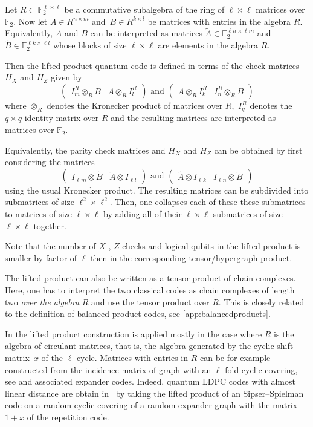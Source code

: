 \documentclass[amsmath, amssymb, floatfix, reprint, twocolumn, notitlepage, 10pt]{revtex4-1}
\newcommand{\change}{}
\begin{document}
Let $R\subset \mathbb{F}_2^{\ell\times \ell}$
be a commutative subalgebra of the ring of $\ell\times\ell$ matrices over $\mathbb{F}_2.$
Now let $A\in R^{n\times m}$ and~$B\in R^{k\times l}$ be matrices with entries in the algebra $R.$ Equivalently, $A$ and $B$ can be interpreted as matrices $\tilde{A}\in \mathbb{F}_2^{\ell n\times \ell m}$ and $\tilde{B}\in \mathbb{F}_2^{\ell k\times \ell l}$ whose blocks of size $\ell\times\ell$ are elements in the algebra $R.$ 

{\change Then the lifted product quantum code is defined in terms of the check matrices $H_X$ and $H_Z$ given by
$$\begin{pmatrix}
 I_m^R\otimes_R B &
 A\otimes_R I_l^R 
\end{pmatrix}\text{ and } 
\begin{pmatrix} A\otimes_R I_k^R & I_n^R\otimes_R B\end{pmatrix}$$
where $\otimes_R$ denotes the Kronecker product of matrices over $R,$ $I_q^R$ denotes the $q\times q$ identity matrix over $R$ and the resulting matrices are interpreted as matrices over $\mathbb{F}_2.$ 

Equivalently, the parity check matrices and $H_X$ and $H_Z$ can be obtained by first considering the matrices
$$\begin{pmatrix}
 I_{\ell m}\otimes \tilde{B} &
 \tilde{A}\otimes I_{\ell l} 
\end{pmatrix}\text{ and } 
\begin{pmatrix} \tilde{A}\otimes I_{\ell k} & I_{\ell n}\otimes \tilde{B}\end{pmatrix}$$
using the usual Kronecker product. The resulting matrices can be subdivided into submatrices of size $\ell^2\times\ell^2.$ Then, one collapses each of these these submatrices to matrices of size $\ell\times\ell$ by adding all of their $\ell\times\ell$ submatrices of size $\ell\times\ell$ together.}

Note that the number of $X$-, $Z$-checks and logical qubits in the lifted product is smaller by factor of $\ell$ then in the corresponding tensor/hypergraph product.

The lifted product can also be written as a tensor product of chain complexes. Here, one has to interpret the two classical codes as chain complexes of length two \emph{over the algebra} $R$ and use the tensor product over $R.$ This is closely related to the definition of balanced product codes, see \cref{app:balancedproducts}.

In \cite{panteleev2019degenerate, panteleev2020quantum} the lifted product construction is applied mostly in the case where $R$ is the algebra of circulant matrices, that is, the algebra generated by the cyclic shift matrix~$x$ of the $\ell$-cycle. 
Matrices with entries in $R$ can be for example constructed from the incidence matrix of graph with an $\ell$-fold cyclic covering, see \cite{agarwal_expansion_2019} and associated expander codes. Indeed, quantum LDPC codes with almost linear distance are obtain in~\cite{panteleev2020quantum} by taking the lifted product of an Sipser--Spielman code on a random cyclic covering of a random expander graph with the matrix $1+x$ of the repetition code.
\end{document}
